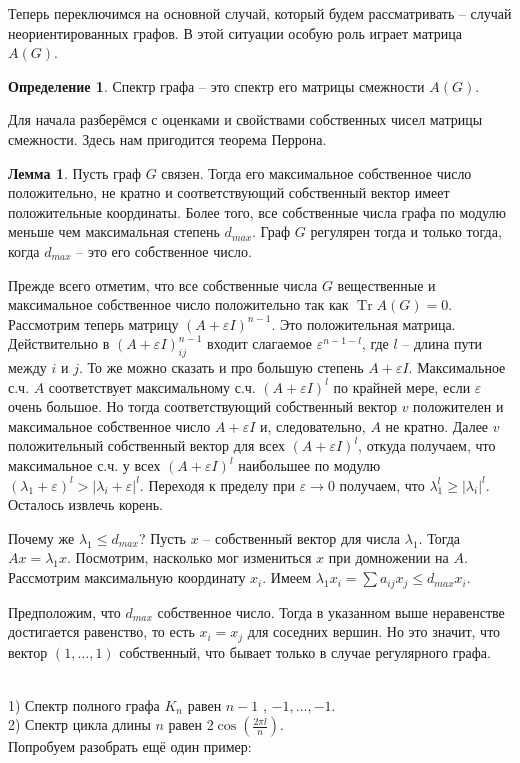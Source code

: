 \documentclass[10pt,a4paper,oneside]{book}
\theoremstyle{definition}
\newtheorem*{defn}{{\color{yellow!20!red} Определение}}
\newtheorem{lem}{Лемма}
\newcommand{\Tr}{\operatorname{Tr}}
\def\exm{\noindent {\bf Примеры:}}
\def\eps{\varepsilon}
\def\dfn{\begin{defn}}
\def\edfn{\end{defn}}
\def\lm{\begin{lem}}
\def\elm{\end{lem}}
\begin{document}
Теперь переключимся на основной случай, который будем рассматривать -- случай неориентированных графов. В этой ситуации особую роль играет матрица $A(G)$.


\dfn Спектр графа -- это спектр его матрицы смежности $A(G)$.
\edfn


Для начала разберёмся с оценками и свойствами собственных чисел матрицы смежности. Здесь нам пригодится теорема Перрона. 


\lm Пусть граф $G$ связен. Тогда его максимальное собственное число положительно, не кратно и соответствующий собственный вектор имеет положительные координаты. Более того, все собственные числа графа по модулю меньше чем максимальная степень $d_{max}$. Граф $G$ регулярен тогда и только тогда, когда $d_{max}$ -- это его собственное число.
\elm
\proof Прежде всего отметим, что все собственные числа $G$ вещественные и максимальное собственное число положительно так как $\Tr A(G)=0$. Рассмотрим теперь матрицу $(A+\eps I)^{n-1}$. Это положительная матрица. Действительно в $(A+\eps I)^{n-1}_{ij}$ входит слагаемое $\eps^{n-1-l}$, где $l$ -- длина пути между $i$ и $j$. То же можно сказать и про большую степень $A+\eps I$. Максимальное с.ч. $A$ соответствует максимальному с.ч. $(A+\eps I)^l$ по крайней мере, если $\eps$ очень большое. Но тогда соответствующий собственный вектор $v$ положителен и максимальное собственное число $A+\eps I$ и, следовательно, $A$ не кратно. Далее $v$ положительный собственный вектор для всех $(A+\eps I)^{l}$, откуда получаем, что максимальное с.ч. у всех $(A+\eps I)^{l}$ наибольшее по модулю $(\lambda_1+\eps)^l>|\lambda_i+\eps|^l$. Переходя к пределу при $\eps \to 0$ получаем, что $\lambda_1^l \geq |\lambda_i|^l$. Осталось извлечь корень.

Почему же $\lambda_1 \leq d_{max}$? Пусть $x$ -- собственный вектор для числа $\lambda_1$. Тогда $Ax=\lambda_1 x$. Посмотрим, насколько мог измениться $x$ при домножении на $A$. Рассмотрим максимальную координату $x_i$. Имеем $\lambda_1 x_i= \sum a_{ij}x_j\leq d_{max} x_i$.

Предположим, что $d_{max}$ собственное число. Тогда в указанном выше неравенстве достигается равенство, то есть $x_i=x_j$ для соседних вершин. Но это значит, что вектор $(1,\dots,1)$ собственный, что бывает только в случае регулярного графа. 
\endproof


\exm \\
1) Спектр полного графа $K_n$ равен $n-1$ , $-1, \dots,-1$.\\
2) Спектр цикла длины $n$ равен $2\cos(\frac{2\pi l}{n})$.\\
Попробуем разобрать ещё один пример:
\end{document}
